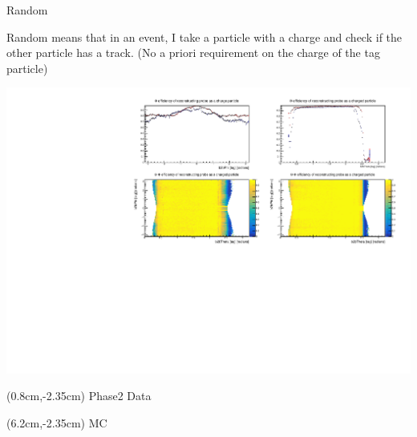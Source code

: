 \documentclass[10pt]{beamer}
\begin{document}
\begin{frame}{Random}
	\begin{flushleft}

	Random means that in an event, I take a particle with a charge and check if the other particle has a track. (No a priori requirement on the charge of the tag particle)
	
			
\end{flushleft}
	\centering
	\includegraphics[width=\textwidth]{Additional/Random}
	
	
	\begin{textblock*}{0.3\textwidth}(0.8cm,-2.35cm)
		\scriptsize{Phase2 Data}
	\end{textblock*}
	
\begin{textblock*}{0.3\textwidth}(6.2cm,-2.35cm)
	\scriptsize{MC}
\end{textblock*}



	
\end{frame}
\end{document}
